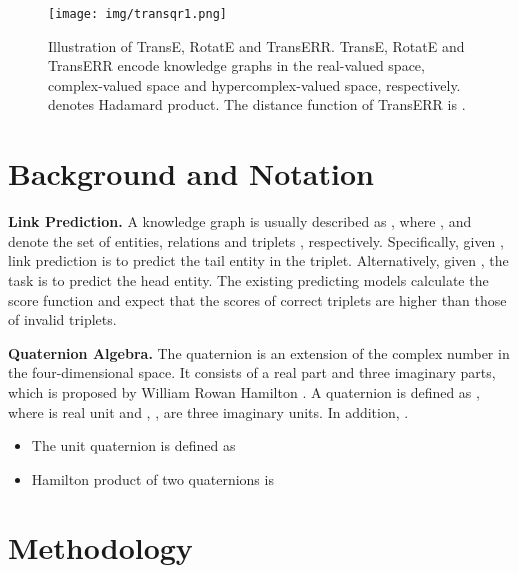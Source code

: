 \documentclass[11pt]{article}
\begin{document}
\begin{figure*}[!htb]
	\centering
	\texttt{[image: img/transqr1.png]}
	\caption{Illustration of TransE, RotatE and TransERR. TransE, RotatE and TransERR encode knowledge graphs in the real-valued space, complex-valued space and hypercomplex-valued space, respectively.  denotes Hadamard product.  The distance function of TransERR is .}
	\label{fig:transqr}
\end{figure*}





\section{Background and Notation}\label{sec3}

\textbf{Link Prediction.}
A knowledge graph is usually described as , where ,   and  denote the set of entities, relations and triplets , respectively. Specifically, given , link prediction is to predict the tail entity in the triplet. Alternatively, given , the task is to predict the head entity. The existing predicting models calculate the score function  and expect that the scores of correct triplets are higher than those of invalid triplets.



\textbf{Quaternion Algebra.} The quaternion is an extension of the complex number in the four-dimensional space. It consists of a real part and three imaginary parts, which is proposed by William Rowan Hamilton \cite{34hamilton1844theory}.
A quaternion  is defined as , where  is real unit and , ,  are three imaginary units. In addition, .


\begin{itemize}
	\item The unit quaternion  is defined as
	      

	\item Hamilton product of two quaternions is
	      
\end{itemize}





\section{Methodology}
\end{document}
